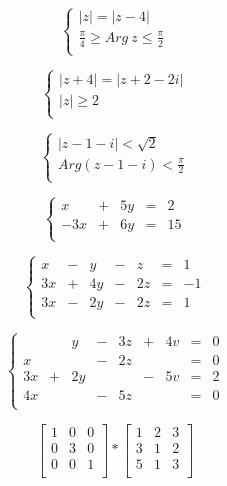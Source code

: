 \documentclass[12pt, letterpaper, titlepage]{article}
\begin{document}
\begin{center}
$$
\begin{cases}
|z|= |z - 4| \\
\frac{\pi}{4}\geq Arg \ z \leq \frac{\pi}{2} \\
\end{cases}$$

$$
\begin{cases}
|z+4|= |z+2- 2i| \\
|z|\geq 2\\
\end{cases}$$

$$
\begin{cases}
|z-1-i|< \sqrt{2} \\
Arg(z-1-i)<\frac{\pi}{2}\\
\end{cases}$$

$$\left\{
\begin{array}{rrrrr}
x&+&5y&=&2 \\
-3x&+&6y&=&15\\
\end{array}
\right.
$$

$$\left\{
\begin{array}{rrrrrrr}
x& -& y& -& z& =& 1 \\
3x& +& 4y& -& 2z& =& -1\\
3x& -& 2y& -& 2z& =& 1\\
\end{array}
\right.
$$

$$\left\{
\begin{array}{rrrrrrrrr}
 &  & y& -& 3z& +& 4v& =& 0 \\
x&  &  & -& 2z&  &   & =& 0 \\
3x&  +&  2y& & &  -&   5v& =& 2\\
4x&  &  & -& 5z&  &   & =& 0\\
\end{array}
\right.
$$

$$
\mathbf{}
\left[ \begin{array}{ccc}
1 & 0 & 0 \\
0 & 3 & 0 \\
0 & 0 & 1 \\
\end{array} 
\right]
*
\mathbf{}
\left[ \begin{array}{ccc}
1 & 2 & 3 \\
3 & 1 & 2 \\
5 & 1 & 3 \\
\end{array} 
\right]$$


\end{center}
\end{document}
